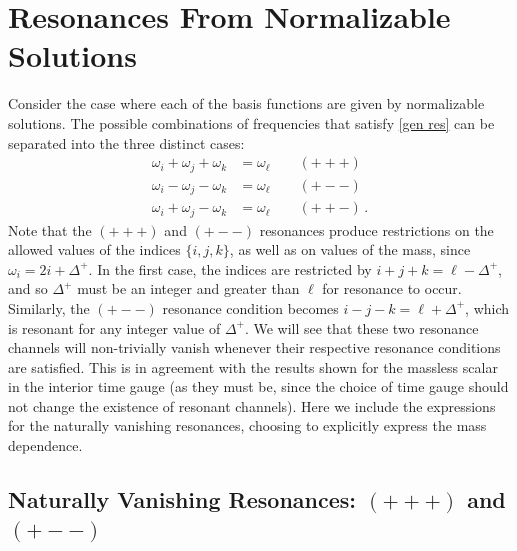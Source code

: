 \documentclass[letterpaper,11pt]{article}
\newcommand{\oi}{\omega_i}
\newcommand{\oj}{\omega_j}
\newcommand{\ok}{\omega_k}
\newcommand{\ol}{\omega_\ell}
\begin{document}

\section{Resonances From Normalizable Solutions}
\label{sec: norm res}
Consider the case where each of the basis functions are given by normalizable solutions. The possible combinations of frequencies that satisfy \eqref{gen res} can be separated into the three distinct cases:
\begin{align}
\oi + \oj + \ok &= \ol \qquad (+++) \\
\oi - \oj - \ok &= \ol \qquad (+--) \\
\oi + \oj - \ok &= \ol \qquad (++-) \, .
\end{align}
Note that the $(+++)$ and $(+--)$ resonances produce restrictions on the allowed values of the indices $\{i, j, k\}$, as well as on values of the mass, since $\oi = 2 i + \Delta^+$. In the first case, the indices are restricted by ${i + j + k = \ell - \Delta^+}$, and so $\Delta^+$ must be an integer and greater than $\ell$ for resonance to occur. Similarly, the $(+--)$ resonance condition becomes ${i - j - k = \ell + \Delta^+}$, which is resonant for any integer value of $\Delta^+$. We will see that these two resonance channels will non-trivially vanish whenever their respective resonance conditions are satisfied. This is in agreement with the results shown for the massless scalar in the interior time gauge (as they must be, since the choice of time gauge should not change the existence of resonant channels). Here we include the expressions for the naturally vanishing resonances, choosing to explicitly express the mass dependence.


\subsection{Naturally Vanishing Resonances: $(+++)$ and $(+--)$}
\label{ssec: zero resonance}
\end{document}
